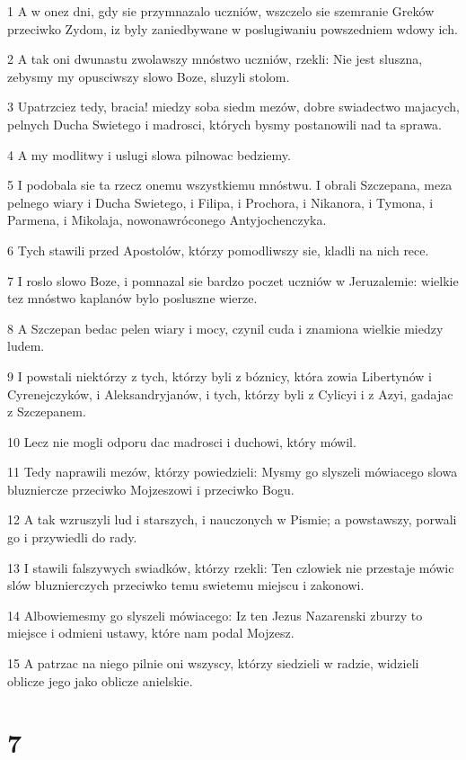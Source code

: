 \par 1 A w onez dni, gdy sie przymnazalo uczniów, wszczelo sie szemranie Greków przeciwko Zydom, iz byly zaniedbywane w poslugiwaniu powszedniem wdowy ich.
\par 2 A tak oni dwunastu zwolawszy mnóstwo uczniów, rzekli: Nie jest sluszna, zebysmy my opusciwszy slowo Boze, sluzyli stolom.
\par 3 Upatrzciez tedy, bracia! miedzy soba siedm mezów, dobre swiadectwo majacych, pelnych Ducha Swietego i madrosci, których bysmy postanowili nad ta sprawa.
\par 4 A my modlitwy i uslugi slowa pilnowac bedziemy.
\par 5 I podobala sie ta rzecz onemu wszystkiemu mnóstwu. I obrali Szczepana, meza pelnego wiary i Ducha Swietego, i Filipa, i Prochora, i Nikanora, i Tymona, i Parmena, i Mikolaja, nowonawróconego Antyjochenczyka.
\par 6 Tych stawili przed Apostolów, którzy pomodliwszy sie, kladli na nich rece.
\par 7 I roslo slowo Boze, i pomnazal sie bardzo poczet uczniów w Jeruzalemie: wielkie tez mnóstwo kaplanów bylo posluszne wierze.
\par 8 A Szczepan bedac pelen wiary i mocy, czynil cuda i znamiona wielkie miedzy ludem.
\par 9 I powstali niektórzy z tych, którzy byli z bóznicy, która zowia Libertynów i Cyrenejczyków, i Aleksandryjanów, i tych, którzy byli z Cylicyi i z Azyi, gadajac z Szczepanem.
\par 10 Lecz nie mogli odporu dac madrosci i duchowi, który mówil.
\par 11 Tedy naprawili mezów, którzy powiedzieli: Mysmy go slyszeli mówiacego slowa bluzniercze przeciwko Mojzeszowi i przeciwko Bogu.
\par 12 A tak wzruszyli lud i starszych, i nauczonych w Pismie; a powstawszy, porwali go i przywiedli do rady.
\par 13 I stawili falszywych swiadków, którzy rzekli: Ten czlowiek nie przestaje mówic slów bluznierczych przeciwko temu swietemu miejscu i zakonowi.
\par 14 Albowiemesmy go slyszeli mówiacego: Iz ten Jezus Nazarenski zburzy to miejsce i odmieni ustawy, które nam podal Mojzesz.
\par 15 A patrzac na niego pilnie oni wszyscy, którzy siedzieli w radzie, widzieli oblicze jego jako oblicze anielskie.

\chapter{7}

